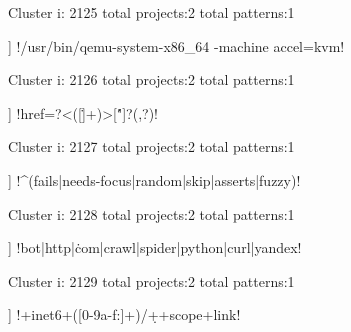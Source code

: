 Cluster i: 2125
total projects:2
total patterns:1
\begin{multicols}{1}
\begin{description}[noitemsep,topsep=0pt]
\item [[2] ] \cverb!/usr/bin/qemu-system-x86_64 -machine accel=kvm!
\end{description}
\end{multicols}







Cluster i: 2126
total projects:2
total patterns:1
\begin{multicols}{1}
\begin{description}[noitemsep,topsep=0pt]
\item [[2] ] \cverb!href\s*=\s*[\'"]?<([\w\.]+)>[\'"]?\s*(,?)!
\end{description}
\end{multicols}







Cluster i: 2127
total projects:2
total patterns:1
\begin{multicols}{1}
\begin{description}[noitemsep,topsep=0pt]
\item [[2] ] \cverb!^(fails|needs-focus|random|skip|asserts|fuzzy)!
\end{description}
\end{multicols}







Cluster i: 2128
total projects:2
total patterns:1
\begin{multicols}{1}
\begin{description}[noitemsep,topsep=0pt]
\item [[2] ] \cverb!bot|http|\.com|crawl|spider|python|curl|yandex!
\end{description}
\end{multicols}







Cluster i: 2129
total projects:2
total patterns:1
\begin{multicols}{1}
\begin{description}[noitemsep,topsep=0pt]
\item [[2] ] \cverb!\s+inet6\s+([0-9a-f:]+)/\d+\s+scope\s+link!
\end{description}
\end{multicols}







